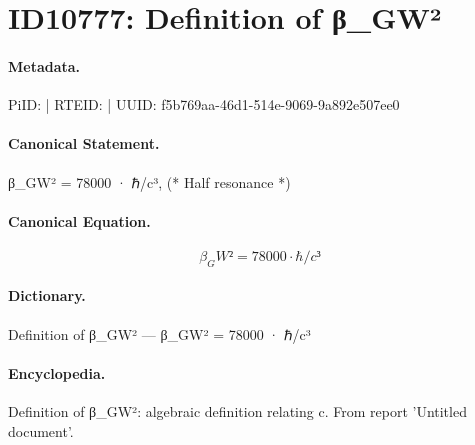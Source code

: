 \section*{ID10777: Definition of β\_GW²}
\paragraph{Metadata.}
PiID:  | RTEID:  | UUID: f5b769aa-46d1-514e-9069-9a892e507ee0

\paragraph{Canonical Statement.}
β\_GW² = 78000 · ℏ/c³, (* Half resonance *)

\paragraph{Canonical Equation.}
\[
β_GW² = 78000 · ℏ/c³
\]

\paragraph{Dictionary.}
Definition of β\_GW² — β\_GW² = 78000 · ℏ/c³

\paragraph{Encyclopedia.}
Definition of β\_GW²: algebraic definition relating c. From report 'Untitled document'.
